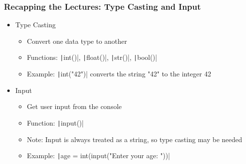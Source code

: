 \documentclass{beamer}
\begin{document}
\begin{frame}
    \frametitle{Recapping the Lectures: Type Casting and Input}
    \begin{itemize}
        \item Type Casting
              \begin{itemize}
                  \item Convert one data type to another
                  \item Functions: \texttt|int()|, \texttt|float()|, \texttt|str()|, \texttt|bool()|
                  \item Example: \texttt|int("42")| converts the string "42" to the integer 42
              \end{itemize}
        \item Input
              \begin{itemize}
                  \item Get user input from the console
                  \item Function: \texttt|input()|
                  \item Note: Input is always treated as a string, so type casting may be needed
                  \item Example: \texttt|age = int(input("Enter your age: "))|
              \end{itemize}
    \end{itemize}
\end{frame}
\end{document}
